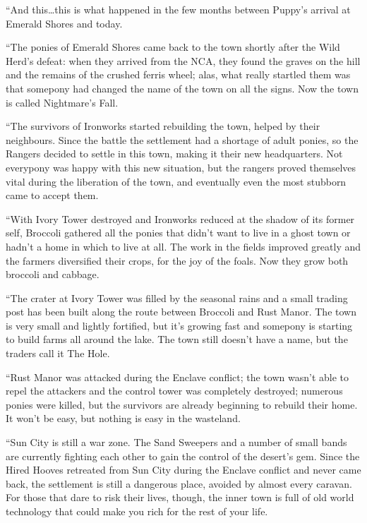 {``And this\dots this is what happened in the few months between Puppy's arrival at Emerald Shores and today.

``The ponies of Emerald Shores came back to the town shortly after the Wild Herd's defeat: when they arrived from the NCA, they found the graves on the hill and the remains of the crushed ferris wheel; alas, what really startled them was that somepony had changed the name of the town on all the signs. Now the town is called Nightmare's Fall.

``The survivors of Ironworks started rebuilding the town, helped by their neighbours. Since the battle the settlement had a shortage of adult ponies, so the Rangers decided to settle in this town, making it their new headquarters. Not everypony was happy with this new situation, but the rangers proved themselves vital during the liberation of the town, and eventually even the most stubborn came to accept them.

``With Ivory Tower destroyed and Ironworks reduced at the shadow of its former self, Broccoli gathered all the ponies that didn't want to live in a ghost town or hadn't a home in which to live at all. The work in the fields improved greatly and the farmers diversified their crops, for the joy of the foals. Now they grow both broccoli and cabbage.

``The crater at Ivory Tower was filled by the seasonal rains and a small trading post has been built along the route between Broccoli and Rust Manor. The town is very small and lightly fortified, but it's growing fast and somepony is starting to build farms all around the lake. The town still doesn't have a name, but the traders call it The Hole.

``Rust Manor was attacked during the Enclave conflict; the town wasn't able to repel the attackers and the control tower was completely destroyed; numerous ponies were killed, but the survivors are already beginning to rebuild their home. It won't be easy, but nothing is easy in the wasteland.

``Sun City is still a war zone. The Sand Sweepers and a number of small bands are currently fighting each other to gain the control of the desert's gem. Since the Hired Hooves retreated from Sun City during the Enclave conflict and never came back, the settlement is still a dangerous place, avoided by almost every caravan. For those that dare to risk their lives, though, the inner town is full of old world technology that could make you rich for the rest of your life.

}
